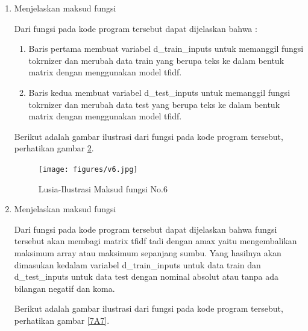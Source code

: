 \begin{enumerate}
	\par Berikut adalh gambar ilustrasi dari fungsi pada kode program tersebut, perhatikan gambar \ref{7A5}.
	
		\begin{figure}[!hbtp]
		\centering
		\texttt{[image: figures/v5.jpg]}
		\caption{Lusia-Ilustrasi Maksud fungsi No.5}
		\label{7A5}
		\end{figure}

\item Menjelaskan maksud fungsi
	
		
	\par Dari fungsi pada kode program tersebut dapat dijelaskan bahwa :
	\begin{enumerate}
	\item Baris pertama membuat variabel d\_train\_inputs untuk memanggil fungsi tokrnizer dan merubah data train yang berupa teks ke dalam bentuk matrix dengan menggunakan model tfidf.
	\item Baris kedua membuat variabel d\_test\_inputs untuk memanggil fungsi tokrnizer dan merubah data test yang berupa teks ke dalam bentuk matrix dengan menggunakan model tfidf.
	\end{enumerate}
	
	\par Berikut adalah gambar ilustrasi dari fungsi pada kode program tersebut, perhatikan gambar \ref{7A6}.
	
		\begin{figure}[!hbtp]
		\centering
		\texttt{[image: figures/v6.jpg]}
		\caption{Lusia-Ilustrasi Maksud fungsi No.6}
		\label{7A6}
		\end{figure}
		
\item Menjelaskan maksud fungsi
	
		
	\par Dari fungsi pada kode program tersebut dapat dijelaskan bahwa fungsi tersebut akan membagi matrix tfidf tadi dengan amax yaitu mengembalikan maksimum array atau maksimum sepanjang sumbu. Yang hasilnya akan dimasukan kedalam variabel d\_train\_inputs untuk data train dan d\_test\_inputs untuk data test dengan nominal absolut atau tanpa ada bilangan negatif dan koma.
	
	\par Berikut adalah gambar ilustrasi dari fungsi pada kode program tersebut, perhatikan gambar \ref{7A7}.
	

\end{enumerate}
